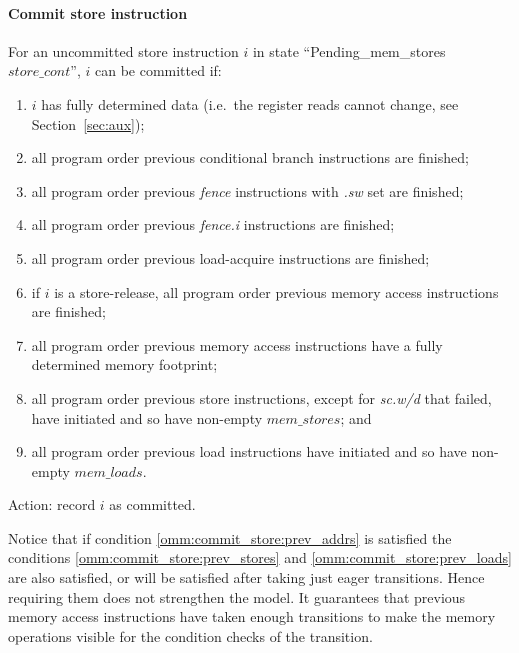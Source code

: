 \paragraph{Commit store instruction}\label{omm:thread:commit_store}
For an uncommitted store instruction $i$ in state ``{\sc Pending\_mem\_stores} $store\_cont$'', $i$ can be committed if:
\begin{enumerate}
\item $i$ has fully determined data (i.e.~the register reads cannot change, see Section~\ref{sec:aux});
\item all program order previous conditional branch instructions are finished;
\item all program order previous {\em fence} instructions with {\em .sw} set are finished;
\item all program order previous {\em fence.i} instructions are finished; 
\item all program order previous load-acquire instructions are finished;
\item  if $i$ is a store-release, all program order previous memory access instructions are finished;
\item\label{omm:commit_store:prev_addrs} all program order previous memory access instructions have a fully determined memory footprint;
\item\label{omm:commit_store:prev_stores} all program order previous store instructions, except for {\em sc.w/d} that failed, have initiated and so have non-empty $mem\_stores$; and
\item\label{omm:commit_store:prev_loads} all program order previous load instructions have initiated and so have non-empty $mem\_loads$.
\end{enumerate}
Action: record $i$ as committed.

\begin{commentary}
Notice that if condition \ref{omm:commit_store:prev_addrs} is satisfied the conditions \ref{omm:commit_store:prev_stores} and \ref{omm:commit_store:prev_loads} are also satisfied, or will be satisfied after taking just eager transitions.
Hence requiring them does not strengthen the model.
It guarantees that previous memory access instructions have taken enough transitions to make the memory operations visible for the condition checks of the  transition.
\end{commentary}


